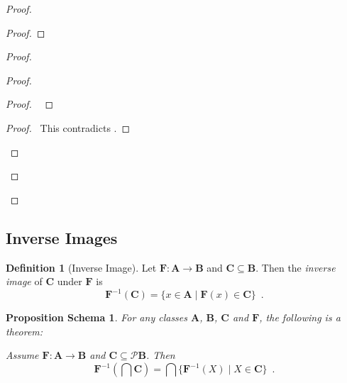 \documentclass{book}
\let\qed\relax
\newtheorem{props}[ax]{Proposition Schema}
\theoremstyle{definition}
\newtheorem{df}[ax]{Definition}
\begin{document}
\begin{proof}
\pf
{}
\begin{proof}
\end{proof}
\begin{proof}
	\begin{proof}
		\begin{proof}
			\pf\ 
		\end{proof}
		\qedstep
		\begin{proof}
			\pf\ This contradicts .
		\end{proof}
	\end{proof}
\end{proof}
\qed
\end{proof}

\subsection{Inverse Images}

\begin{df}[Inverse Image]
Let $\mathbf{F} : \mathbf{A} \rightarrow \mathbf{B}$ and $\mathbf{C} \subseteq \mathbf{B}$. Then the \emph{inverse image} of $\mathbf{C}$ under $\mathbf{F}$ is
\[ \mathbf{F}^{-1}(\mathbf{C}) = \{ x \in \mathbf{A} \mid \mathbf{F}(x) \in \mathbf{C} \} \enspace . \]
\end{df}

\begin{props}
For any classes $\mathbf{A}$, $\mathbf{B}$, $\mathbf{C}$ and $\mathbf{F}$, the following is a theorem:

Assume $\mathbf{F} : \mathbf{A} \rightarrow \mathbf{B}$ and $\mathbf{C} \subseteq \mathcal{P} \mathbf{B}$. Then
\[ \mathbf{F}^{-1} \left( \bigcap \mathbf{C} \right) = \bigcap \{ \mathbf{F}^{-1}(X) \mid X \in \mathbf{C} \} \enspace . \]
\end{props}
\end{document}
